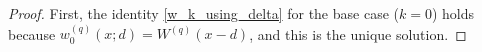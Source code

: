 \documentclass[12pt,reqno]{amsart}
\theoremstyle{definition}
\theoremstyle{remark}
\begin{document}
\begin{proof}
First, the identity \eqref{w_k_using_delta} for the base case ($k=0$) holds because $w_0^{(q)}(x;d)=W^{(q)}(x-d)$, and this is the unique solution.  


\end{proof}
\end{document}
